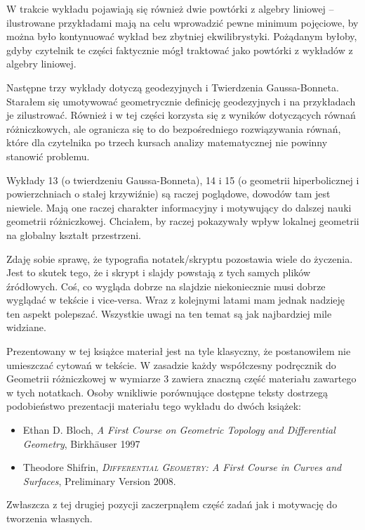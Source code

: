 W trakcie wykładu pojawiają się r\'ownież dwie powt\'orki z algebry liniowej -- 
ilustrowane przykładami mają na celu wprowadzić pewne minimum pojęciowe, by 
można było kontynuować wykład bez zbytniej ekwilibrystyki. Pożądanym byłoby, 
gdyby czytelnik te części faktycznie m\'ogł traktować jako powt\'orki z 
wykład\'ow z algebry liniowej.



Następne trzy wykłady dotyczą geodezyjnych i Twierdzenia Gaussa-Bonneta. 
Starałem się umotywować geometrycznie definicję geodezyjnych i na przykładach 
je zilustrować. R\'ownież i w tej części korzysta się z wynik\'ow 
dotyczących r\'ownań r\'ożniczkowych, ale ogranicza się to do bezpośredniego 
rozwiązywania r\'ownań, kt\'ore dla czytelnika po trzech kursach analizy 
matematycznej nie powinny stanowić problemu.

Wykłady 13 (o twierdzeniu Gaussa-Bonneta), 14 i 15 (o geometrii hiperbolicznej 
i powierzchniach o stałej krzywiźnie) są raczej poglądowe, dowodów tam jest 
niewiele. Mają one raczej charakter informacyjny i motywujący do dalszej nauki 
geometrii różniczkowej. Chciałem, by raczej pokazywały wpływ lokalnej geometrii 
na globalny kształt przestrzeni.

\thispagestyle{empty}

Zdaję sobie sprawę, że typografia notatek/skryptu pozostawia wiele do życzenia. 
Jest to skutek tego, że i skrypt i slajdy powstają z tych samych plików 
źródłowych. Coś, co wygląda dobrze na slajdzie niekoniecznie musi dobrze 
wyglądać w tekście i vice-versa. Wraz z kolejnymi latami mam jednak 
nadzieję ten aspekt polepszać. Wszystkie uwagi na ten temat są jak najbardziej 
mile widziane.


\vfill

\thispagestyle{empty}
Prezentowany w tej książce materiał jest na tyle klasyczny, że postanowiłem nie 
umieszczać cytowań w tekście. W zasadzie każdy wsp\'ołczesny podręcznik do 
Geometrii r\'ożniczkowej w wymiarze $3$ zawiera znaczną część materiału 
zawartego w tych notatkach. Osoby wnikliwie por\'ownujące dostępne 
teksty dostrzegą podobieństwo prezentacji materiału tego wykładu do dw\'och 
książek:

\begin{itemize}
 \item Ethan D. Bloch, \textit{A First Course on Geometric Topology and 
Differential Geometry}, Birkh\"auser 1997
\item Theodore Shifrin, \textit{\textsc{Differential Geometry}: A First Course 
in Curves and Surfaces}, Preliminary Version 2008.
\end{itemize}

Zwłaszcza z tej drugiej pozycji zaczerpnąłem część zadań jak i motywację do 
tworzenia własnych.\thispagestyle{empty}